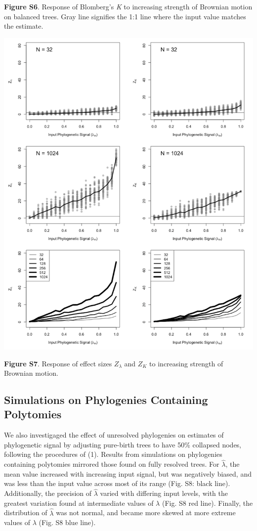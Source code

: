 \documentclass[
]{article}
\begin{document}
\textbf{Figure S6}. Response of Blomberg's \textit{K} to increasing
strength of Brownian motion on balanced trees. Gray line signifies the
1:1 line where the input value matches the estimate.

\includegraphics[width=0.95\linewidth]{fig.S7}

\textbf{Figure S7}. Response of effect sizes \(Z_{\lambda}\) and \(Z_K\)
to increasing strength of Brownian motion.

\newpage

\hypertarget{simulations-on-phylogenies-containing-polytomies}{%
\subsection{Simulations on Phylogenies Containing
Polytomies}\label{simulations-on-phylogenies-containing-polytomies}}

We also investigaged the effect of unresolved phylogenies on estimates
of phylogenetic signal by adjusting pure-birth trees to have 50\%
collapsed nodes, following the procedures of (1). Results from
simulations on phylogenies containing polytomies mirrored those found on
fully resolved trees. For \(\hat{\lambda}\), the mean value increased
with increasing input signal, but was negatively biased, and was less
than the input value across most of its range (Fig. S8: black line).
Additionally, the precision of \(\hat{\lambda}\) varied with differing
input levels, with the greatest variation found at intermediate values
of \(\lambda\) (Fig. S8 red line). Finally, the distribution of
\(\hat{\lambda}\) was not normal, and became more skewed at more extreme
values of \(\lambda\) (Fig. S8 blue line). \hfill\break
\end{document}
